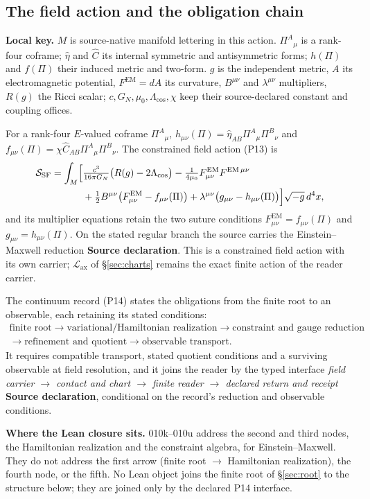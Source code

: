 \documentclass[11pt,a4paper]{article}
\newcommand{\Lag}{\mathcal{L}_{\mathrm{ax}}}\newcommand{\Hax}{\mathcal{H}_{\mathrm{ax}}}
\newcommand{\FEM}{F^{\mathrm{EM}}}
\newcommand{\st}[1]{\textsf{\small\textbf{#1}}}
\newcommand{\Ssrc}{\st{Source declaration}}\newcommand{\Sint}{\st{Interface}}
\newcommand{\lkey}[1]{\par\noindent\textbf{Local key.} #1\par\smallskip}
\theoremstyle{plain}
\theoremstyle{definition}
\theoremstyle{remark}
\begin{document}
\subsection{The field action and the obligation chain}
\lkey{$M$ is source-native manifold lettering in this action. $\Pi^A{}_\mu$ is a rank-four coframe; $\hat\eta$ and $\hat C$ its internal symmetric and antisymmetric forms; $h(\Pi)$ and $f(\Pi)$ their induced metric and two-form. $g$ is the independent metric, $A$ its electromagnetic potential, $\FEM=dA$ its curvature, $B^{\mu\nu}$ and $\lambda^{\mu\nu}$ multipliers, $R(g)$ the Ricci scalar; $c,G_N,\mu_0,\Lambda_{\mathrm{cos}},\chi$ keep their source-declared constant and coupling offices.}
For a rank-four $E$-valued coframe $\Pi^A{}_\mu$, $h_{\mu\nu}(\Pi)=\hat\eta_{AB}\Pi^A{}_\mu\Pi^B{}_\nu$ and $f_{\mu\nu}(\Pi)=\chi\hat C_{AB}\Pi^A{}_\mu\Pi^B{}_\nu$. The constrained field action (P13) is
\[
\begin{aligned}
\mathcal S_{\mathrm{SF}}=\int_M\Bigl[&\tfrac{c^3}{16\pi G_N}\bigl(R(g)-2\Lambda_{\mathrm{cos}}\bigr)-\tfrac1{4\mu_0}F^{\mathrm{EM}}_{\mu\nu}F^{\mathrm{EM}\,\mu\nu}\\
&+\tfrac12B^{\mu\nu}\bigl(\FEM_{\mu\nu}-f_{\mu\nu}(\Pi)\bigr)+\lambda^{\mu\nu}\bigl(g_{\mu\nu}-h_{\mu\nu}(\Pi)\bigr)\Bigr]\sqrt{-g}\,d^4x,
\end{aligned}
\]
and its multiplier equations retain the two suture conditions $\FEM_{\mu\nu}=f_{\mu\nu}(\Pi)$ and $g_{\mu\nu}=h_{\mu\nu}(\Pi)$. On the stated regular branch the source carries the Einstein--Maxwell reduction \Ssrc. This is a constrained field action with its own carrier; $\Lag$ of \S\ref{sec:charts} remains the exact finite action of the reader carrier.

The continuum record (P14) states the obligations from the finite root to an observable, each retaining its stated conditions:
\[
\begin{gathered}\text{finite root}\to\text{variational/Hamiltonian realization}\to\text{constraint and gauge reduction}\\
\to\text{refinement and quotient}\to\text{observable transport.}\end{gathered}
\]
It requires compatible transport, stated quotient conditions and a surviving observable at field resolution, and it joins the reader by the typed interface \emph{field carrier $\to$ contact and chart $\to$ finite reader $\to$ declared return and receipt} \Ssrc, conditional on the record's reduction and observable conditions.

\begin{rulebox}
\textbf{Where the Lean closure sits.} 010k--010u address the second and third nodes, the Hamiltonian realization and the constraint algebra, for Einstein--Maxwell. They do not address the first arrow (finite root $\to$ Hamiltonian realization), the fourth node, or the fifth. No Lean object joins the finite root of \S\ref{sec:root} to the structure below; they are joined only by the declared P14 interface.
\end{rulebox}
\end{document}
